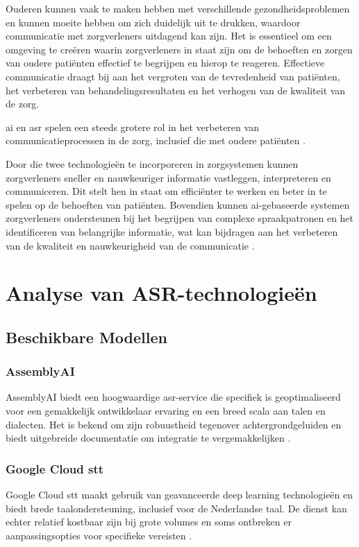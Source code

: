 Ouderen kunnen vaak te maken hebben met verschillende gezondheidsproblemen en kunnen moeite hebben om zich duidelijk uit te drukken, waardoor communicatie met zorgverleners uitdagend kan zijn. Het is essentieel om een ​​omgeving te creëren waarin zorgverleners in staat zijn om de behoeften en zorgen van oudere patiënten effectief te begrijpen en hierop te reageren. Effectieve communicatie draagt bij aan het vergroten van de tevredenheid van patiënten, het verbeteren van behandelingsresultaten en het verhogen van de kwaliteit van de zorg.

\gls{ai} en \gls{asr} spelen een steeds grotere rol in het verbeteren van communicatieprocessen in de zorg, inclusief die met oudere patiënten \autocite{patel2019}. 

Door die twee technologieën te incorporeren in zorgsystemen kunnen zorgverleners sneller en nauwkeuriger informatie vastleggen, interpreteren en communiceren. Dit stelt hen in staat om efficiënter te werken en beter in te spelen op de behoeften van patiënten. Bovendien kunnen \gls{ai}-gebaseerde systemen zorgverleners ondersteunen bij het begrijpen van complexe spraakpatronen en het identificeren van belangrijke informatie, wat kan bijdragen aan het verbeteren van de kwaliteit en nauwkeurigheid van de communicatie \autocite{patel2019}. 
\section{Analyse van ASR-technologieën}

\subsection{Beschikbare Modellen}

\subsubsection{AssemblyAI}
AssemblyAI biedt een hoogwaardige \gls{asr}-service die specifiek is geoptimaliseerd voor een gemakkelijk ontwikkelaar ervaring en een breed scala aan talen en dialecten. 
Het is bekend om zijn robuustheid tegenover achtergrondgeluiden en biedt uitgebreide documentatie om integratie te vergemakkelijken \autocite{assemblyai2024}.

\subsubsection{Google Cloud \gls{stt} }
Google Cloud \gls{stt} maakt gebruik van geavanceerde deep learning technologieën en biedt brede taalondersteuning, inclusief voor de Nederlandse taal. De dienst kan echter relatief kostbaar zijn bij grote volumes en soms ontbreken er aanpassingsopties voor specifieke vereisten \autocite{googleasr2024}.

